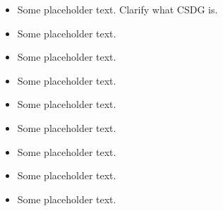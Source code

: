 \documentclass[letterpaper]{resume}
\begin{document}
\begin{minipage}[t]{0.66\textwidth}
\sectionspace %


\begin{itemize}
\item Some placeholder text. Clarify what CSDG is.
\item Some placeholder text.
\item Some placeholder text.
\end{itemize}

\sectionspace %


\begin{itemize}
\item Some placeholder text.
\item Some placeholder text.
\item Some placeholder text.
\end{itemize}

\sectionspace %


\begin{itemize}
\item Some placeholder text.
\item Some placeholder text.
\item Some placeholder text.
\end{itemize}

\sectionspace %


\end{minipage} %
\end{document}

